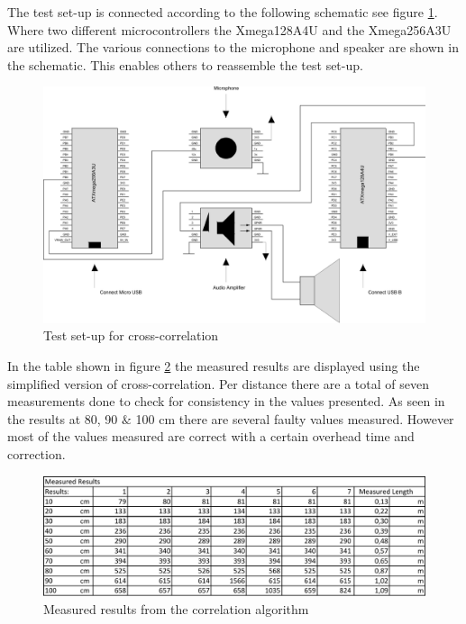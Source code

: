 \documentclass[10pt,a4paper]{article}
\begin{document}
The test set-up is connected according to the following schematic see figure \ref{fig:schemacorrelatie}. Where two different microcontrollers the Xmega128A4U and the Xmega256A3U are utilized. The various connections to the microphone and speaker are shown in the schematic. This enables others to reassemble the test set-up.

\begin{figure}[H]
   \centering
   \includegraphics[width=\textwidth]{correlatieschema.pdf}
   \caption{Test set-up for cross-correlation}
   \label{fig:schemacorrelatie}
\end{figure}

In the table shown in figure \ref{fig:measuredresults} the measured results are displayed using the simplified version of cross-correlation. Per distance there are a total of seven measurements done to check for consistency in the values presented. As seen in the results at 80, 90 $\&$ 100 cm there are several faulty values measured. However most of the values measured are correct with a certain overhead time and correction.

\begin{figure}[H]
   \centering
   \includegraphics[width=\textwidth]{measuredcorrelation.pdf}
   \caption{Measured results from the correlation algorithm}
   \label{fig:measuredresults}
\end{figure}
\end{document}

